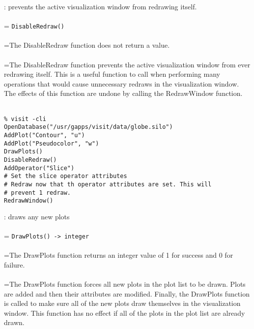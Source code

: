 \documentclass[10pt,a4paper]{report}
\begin{document}
{}
: prevents the active visualization window from redrawing itself.\\[-3mm]

 \\ 
\hangindent=\parindent 
\verb!DisableRedraw()!\\ [-3mm]

 \\ 
\hangindent=\parindent The DisableRedraw function does not return a value. \\[-3mm] 

 \\ 
\hangindent=\parindent The DisableRedraw function prevents the active visualization window from ever redrawing itself. This is a useful function to call when performing many operations that would cause unnecessary redraws in the visualization window. The effects of this function are undone by calling the RedrawWindow function. \\[-3mm] 

\\[-6mm]
\begin{verbatim}% visit -cli
OpenDatabase("/usr/gapps/visit/data/globe.silo")
AddPlot("Contour", "u")
AddPlot("Pseudocolor", "w")
DrawPlots()
DisableRedraw()
AddOperator("Slice")
# Set the slice operator attributes
# Redraw now that th operator attributes are set. This will 
# prevent 1 redraw.
RedrawWindow()
\end{verbatim}
\newpage


{}
: draws any new plots\\[-3mm]

 \\ 
\hangindent=\parindent 
\verb!DrawPlots() -> integer!\\ [-3mm]

 \\ 
\hangindent=\parindent The DrawPlots function returns an integer value of 1 for success and 0 for failure. \\[-3mm] 

 \\ 
\hangindent=\parindent The DrawPlots function forces all new plots in the plot list to be drawn. Plots are added and then their attributes are modified. Finally, the DrawPlots function is called to make sure all of the new plots draw themselves in the visualization window. This function has no effect if all of the plots in the plot list are already drawn. \\[-3mm] 
\end{document}
